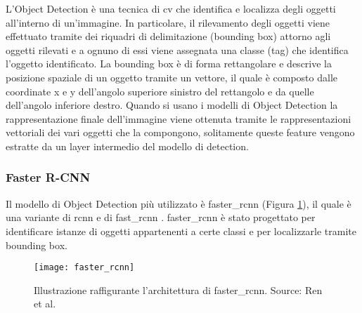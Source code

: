 L'Object Detection è una tecnica di \acrlong{cv} che identifica e localizza degli oggetti all'interno di un'immagine. In particolare, il rilevamento degli oggetti viene effettuato tramite dei riquadri di delimitazione (bounding box) attorno agli oggetti rilevati e a ognuno di essi viene assegnata una classe (tag) che identifica l'oggetto identificato. La bounding box è di forma rettangolare e descrive la posizione spaziale di un oggetto tramite un vettore, il quale è composto dalle coordinate x e y dell'angolo superiore sinistro del rettangolo e da quelle dell'angolo inferiore destro.
Quando si usano i modelli di Object Detection la rappresentazione finale dell'immagine viene ottenuta tramite le rappresentazioni vettoriali dei vari oggetti che la compongono, solitamente queste feature vengono estratte da un layer intermedio del modello di detection.

\subsubsection{Faster R-CNN}\label{faster_rcnn_model}
Il modello di Object Detection più utilizzato è \acrshort{faster_rcnn} \cite{ren2015faster} (Figura \ref{figura:faster_rcnn}), il quale è una variante di \acrshort{rcnn} \cite{girshick2014rich} e di \acrshort{fast_rcnn} \cite{girshick2015fast}.
\acrshort{faster_rcnn} è stato progettato per identificare istanze di oggetti appartenenti a certe classi e per localizzarle tramite bounding box.
\begin{figure}[ht]
\centering
\texttt{[image: faster\_rcnn]}
\caption{Illustrazione raffigurante l'architettura di \acrshort{faster_rcnn}. Source: Ren et al. \cite{ren2015faster}}\label{figura:faster_rcnn}
\end{figure}

